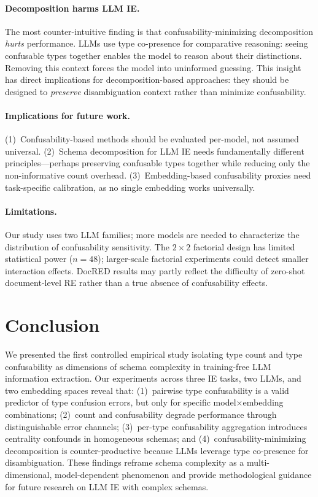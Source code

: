 \documentclass[11pt,a4paper]{article}
\begin{document}
\paragraph{Decomposition harms LLM IE.}
The most counter-intuitive finding is that confusability-minimizing decomposition \emph{hurts} performance.
LLMs use type co-presence for comparative reasoning: seeing confusable types together enables the model to reason about their distinctions.
Removing this context forces the model into uninformed guessing.
This insight has direct implications for decomposition-based approaches: they should be designed to \emph{preserve} disambiguation context rather than minimize confusability.

\paragraph{Implications for future work.}
(1)~Confusability-based methods should be evaluated per-model, not assumed universal.
(2)~Schema decomposition for LLM IE needs fundamentally different principles---perhaps preserving confusable types together while reducing only the non-informative count overhead.
(3)~Embedding-based confusability proxies need task-specific calibration, as no single embedding works universally.

\paragraph{Limitations.}
Our study uses two LLM families; more models are needed to characterize the distribution of confusability sensitivity.
The $2{\times}2$ factorial design has limited statistical power ($n{=}48$); larger-scale factorial experiments could detect smaller interaction effects.
DocRED results may partly reflect the difficulty of zero-shot document-level RE rather than a true absence of confusability effects.


\section{Conclusion}
\label{sec:conclusion}

We presented the first controlled empirical study isolating type count and type confusability as dimensions of schema complexity in training-free LLM information extraction.
Our experiments across three IE tasks, two LLMs, and two embedding spaces reveal that:
(1)~pairwise type confusability is a valid predictor of type confusion errors, but only for specific model$\times$embedding combinations;
(2)~count and confusability degrade performance through distinguishable error channels;
(3)~per-type confusability aggregation introduces centrality confounds in homogeneous schemas; and
(4)~confusability-minimizing decomposition is counter-productive because LLMs leverage type co-presence for disambiguation.
These findings reframe schema complexity as a multi-dimensional, model-dependent phenomenon and provide methodological guidance for future research on LLM IE with complex schemas.
\end{document}
